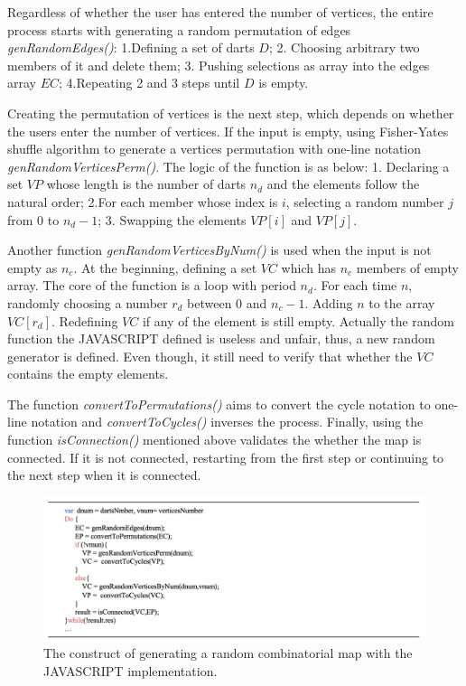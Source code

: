 \begin{itemize}
    Regardless of whether the user has entered the number of vertices, the entire process starts with generating a random permutation of edges \textit{genRandomEdges()}: 1.Defining a set of darts \(D\); 2. Choosing arbitrary two members of it and delete them; 3. Pushing selections as array into the edges array \(EC\); 4.Repeating 2 and 3 steps until \(D\) is empty. 

    Creating the permutation of vertices is the next step, which depends on whether the users enter the number of vertices. If the input is empty, using Fisher-Yates shuffle algorithm \cite{fisher1943statistical} to generate a vertices permutation with one-line notation \textit{genRandomVerticesPerm()}. The logic of the function is as below: 1. Declaring a set \(VP\) whose length is the number of darts \(n_d\) and the elements follow the natural order; 2.For each member whose index is \(i\), selecting a random number \(j\) from 0 to \(n_d -1\); 3. Swapping the elements \(VP[i]\) and \(VP[j]\). 
    
    Another function \textit{genRandomVerticesByNum()} is used when the input is not empty as \(n_c\).  At the beginning, defining a set \(VC\) which has \(n_c\) members of empty array. The core of the function is a loop with period \(n_d\). For each time \(n\), randomly choosing a number \(r_d\) between 0 and \(n_c -1\). Adding \(n\) to the array \(VC[r_d]\). Redefining \(VC\) if any of the element is still empty. Actually the random function the JAVASCRIPT defined is useless and unfair, thus, a new random generator is defined. Even though, it still need to verify that whether the \(VC\) contains the empty elements.

    The function \textit{convertToPermutations()} aims to convert the cycle notation to one-line notation and \textit{convertToCycles()} inverses the process. Finally, using the function \textit{isConnection()} mentioned above validates the whether the map is connected. If it is not connected, restarting from the first step or continuing to the next step when it is connected.
    \begin{figure}[htb]
        \centering
        \includegraphics[width=1\textwidth]{../../image/randompro.png}
        \caption{The construct of generating a random combinatorial map with the JAVASCRIPT implementation.}
        \label{fig:figures:randompro}
      \end{figure} 
  \end{itemize}


